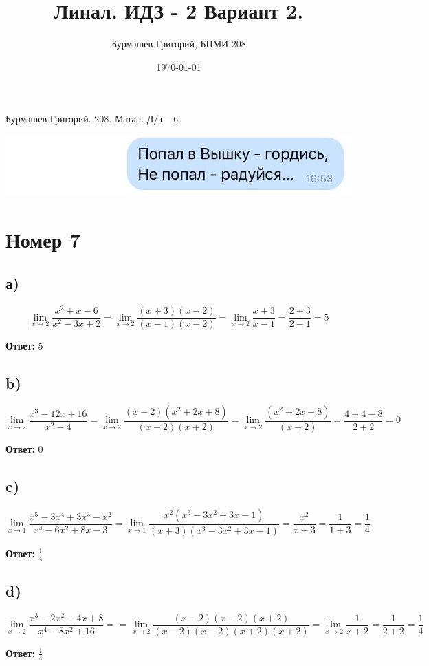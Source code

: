\documentclass[a4paper,12pt]{article}
\author{Бурмашев Григорий, БПМИ-208}
\title{Линал. ИДЗ - 2 Вариант 2.}
\date{\today}
\begin{document}
\begin{center}
Бурмашев Григорий.  208. Матан. Д/з -- 6
\end{center}
\includegraphics[scale=0.5]{vishkajpg.jpg}
\newpage
\section*{Номер 7}
\subsection*{а)}
\[
\lim_{x \rightarrow 2} \frac{x^2+x-6}{x^2-3x+2} = \lim_{x \rightarrow 2} \frac{(x+3)(x-2)}{(x-1)(x-2)} = \lim_{x \rightarrow 2} \frac{x+3}{x-1} = \frac{2+3}{2 - 1}  = 5
\]
\begin{center}
\textbf{Ответ:} 5
\end{center}
\subsection*{b)}
\[
\lim_{x \rightarrow 2} \frac{x^3-12x + 16}{x^2 - 4} = \lim_{x \rightarrow 2} \frac{(x-2)(x^2+2x+8)}{(x-2)(x+2)}  = \lim_{x \rightarrow 2} \frac{(x^2+2x-8)}{(x+2)} = \frac{4 + 4 - 8}{2 + 2 } = 0
\]
\begin{center}
\textbf{Ответ:} 0
\end{center}
\subsection*{c)}
\[
\lim_{x \rightarrow 1} \frac{x^5 - 3x^4 + 3x^3 - x^2}{x^4 - 6x^2 + 8x - 3}  = \lim_{x \rightarrow 1} \frac{x^2(x^3-3x^2+3x-1)}{(x+3)(x^3-3x^2+3x-1)} = \frac{x^2}{x+3} = \frac{1}{1 + 3} = \frac{1}{4}
\]
\begin{center}
\textbf{Ответ:} $\frac{1}{4}$
\end{center}
\subsection*{d)}
\[
\lim_{x \rightarrow 2} \frac{x^3 - 2x^2 - 4x + 8}{x^4 - 8x^2 + 16 } = 
= \lim_{x \rightarrow 2} \frac{(x-2)(x-2)(x+2)}{(x-2)(x-2)(x+2)(x+2)} = \lim_{x \rightarrow 2} \frac{1}{x + 2} = \frac{1}{2 + 2} = \frac{1}{4}
\]
\begin{center}
\textbf{Ответ:} $\frac{1}{4}$
\end{center}
\newpage
\end{document}
